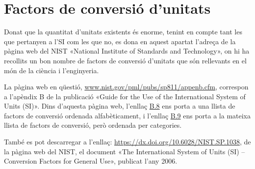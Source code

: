 \section{Factors de conversió d'unitats}\label{sec:SI-fact-conv}
Donat que la quantitat d'unitats existents és enorme, tenint en compte tant les que pertanyen a l'SI com les que no, es dona en aquest apartat l'adreça de la pàgina web del NIST «National Institute of Standards and Technology», on hi ha recollits un bon nombre de factors de conversió d'unitats que són rellevants en el món de la ciència i l'enginyeria.

La pàgina web en  qüestió, \href{http://www.nist.gov/pml/pubs/sp811/appenb.cfm}{www.nist.gov/pml/pubs/sp811/appenb.cfm}, correspon a l'apèndix B de la publicació «Guide for the Use of the International System of Units (SI)».
Dins d'aquesta pàgina web, l'enllaç \href{http://www.nist.gov/pml/pubs/sp811/appenb8.cfm}{B.8} ens porta a una llista de factors de conversió ordenada alfabèticament, i l'enllaç  \href{http://www.nist.gov/pml/pubs/sp811/appenb9.cfm}{B.9} ens porta a la mateixa llista de factors de conversió, però ordenada per categories.

També es pot descarregar a l'enllaç: \href{https://dx.doi.org/10.6028/NIST.SP.1038}{https://dx.doi.org/10.6028/NIST.SP.1038}, de la pàgina web del NIST, el document «The International System of Units (SI) -- Conversion Factors
for General Use», publicat l'any 2006.
